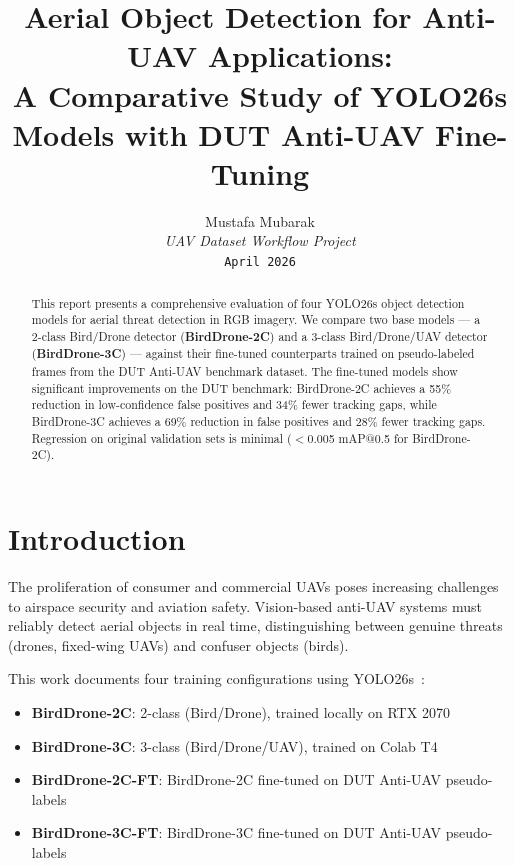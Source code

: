 \documentclass[11pt]{article}
\title{\textbf{Aerial Object Detection for Anti-UAV Applications:\\
A Comparative Study of YOLO26s Models with DUT Anti-UAV Fine-Tuning}}
\author{
  Mustafa Mubarak\\
  \textit{UAV Dataset Workflow Project}\\
  \texttt{April 2026}
}
\date{}
\begin{document}
\maketitle
\tableofcontents
\newpage

\begin{abstract}
This report presents a comprehensive evaluation of four YOLO26s object detection
models for aerial threat detection in RGB imagery. We compare two base models
--- a 2-class Bird/Drone detector (\textbf{BirdDrone-2C}) and a 3-class
Bird/Drone/UAV detector (\textbf{BirdDrone-3C}) --- against their fine-tuned
counterparts trained on pseudo-labeled frames from the DUT Anti-UAV benchmark
dataset. The fine-tuned models show significant improvements on the DUT
benchmark: BirdDrone-2C achieves a 55\% reduction in low-confidence false
positives and 34\% fewer tracking gaps, while BirdDrone-3C achieves a 69\%
reduction in false positives and 28\% fewer tracking gaps. Regression on
original validation sets is minimal ($<$0.005 mAP@0.5 for BirdDrone-2C).
\end{abstract}

\section{Introduction}

The proliferation of consumer and commercial UAVs poses increasing challenges
to airspace security and aviation safety. Vision-based anti-UAV systems must
reliably detect aerial objects in real time, distinguishing between genuine
threats (drones, fixed-wing UAVs) and confuser objects (birds).

This work documents four training configurations using YOLO26s~\cite{ultralytics2025}:
\begin{itemize}
  \item \textbf{BirdDrone-2C}: 2-class (Bird/Drone), trained locally on RTX 2070
  \item \textbf{BirdDrone-3C}: 3-class (Bird/Drone/UAV), trained on Colab T4
  \item \textbf{BirdDrone-2C-FT}: BirdDrone-2C fine-tuned on DUT Anti-UAV pseudo-labels
  \item \textbf{BirdDrone-3C-FT}: BirdDrone-3C fine-tuned on DUT Anti-UAV pseudo-labels
\end{itemize}

\end{document}
